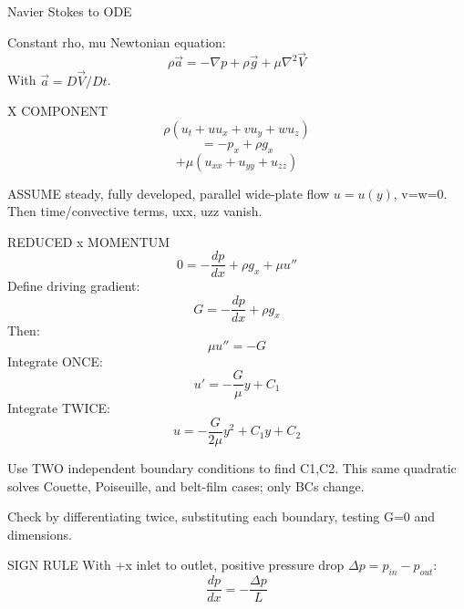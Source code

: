 Navier Stokes to ODE

Constant rho, mu Newtonian equation:
$$\rho\vec a=-\nabla p+\rho\vec g+\mu\nabla^2\vec V$$
With $\vec a=D\vec V/Dt$.

X COMPONENT
$$\rho(u_t+uu_x+vu_y+wu_z)$$
$$=-p_x+\rho g_x$$
$$+\mu(u_{xx}+u_{yy}+u_{zz})$$

ASSUME steady, fully developed, parallel wide-plate flow $u=u(y)$, v=w=0. Then time/convective terms, uxx, uzz vanish.

REDUCED x MOMENTUM
$$0=-\frac{dp}{dx}+\rho g_x+\mu u''$$
Define driving gradient:
$$G=-\frac{dp}{dx}+\rho g_x$$
Then:
$$\mu u''=-G$$
Integrate ONCE:
$$u'=-\frac{G}{\mu}y+C_1$$
Integrate TWICE:
$$u=-\frac{G}{2\mu}y^2+C_1y+C_2$$

Use TWO independent boundary conditions to find C1,C2. This same quadratic solves Couette, Poiseuille, and belt-film cases; only BCs change.

Check by differentiating twice, substituting each boundary, testing G=0 and dimensions.

SIGN RULE
With +x inlet to outlet, positive pressure drop $\Delta p=p_{in}-p_{out}$:
$$\frac{dp}{dx}=-\frac{\Delta p}{L}$$
